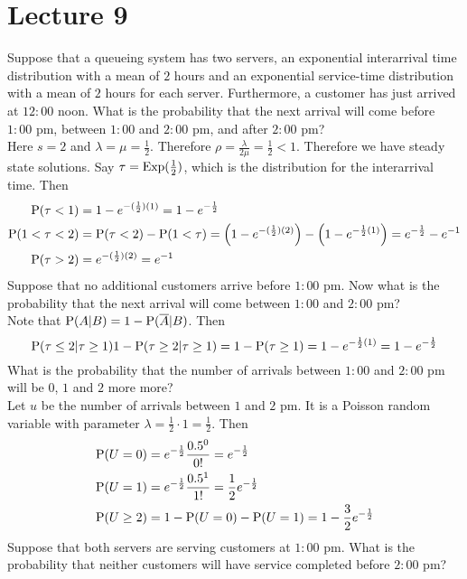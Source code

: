 \documentclass[12pt]{article}
\begin{document}
 \section{Lecture 9} 
 Suppose that a queueing system has two servers, an exponential interarrival time distribution with a mean of $2$ hours and an exponential service-time distribution with a mean of $2$ hours for each server. Furthermore, a customer has just arrived at $12:00$ noon. What is the probability that the next arrival will come before $1:00$ pm, between $1:00$ and $2:00$ pm, and after $2:00$ pm? \\
 Here $s=2$ and $\lambda = \mu = \frac{1}{2}$. Therefore $\rho = \frac{\lambda}{2\mu} = \frac{1}{2} < 1$. Therefore we have steady state solutions. Say $\tau = \text{Exp}( \frac{1}{2} )$, which is the distribution for the interarrival time. Then $$ \begin{aligned} 
 \mathrm{P}( \tau < 1 ) &= 1 - e^{-(\frac{1}{2})(1)} = 1 - e^{-\frac{1}{2}} \\ \mathrm{P}( 1 < \tau < 2 ) &= \mathrm{P}( \tau < 2 ) - \mathrm{P}( 1 < \tau ) = \Big( 1 - e^{-(\frac{1}{2})(2)} \Big) - \Big(1 - e^{-\frac{1}{2}(1)}\Big) = e^{-\frac{1}{2}} - e^{-1} \\ \mathrm{P}( \tau > 2 ) &= e^{-(\frac{1}{2})(2)} = e^{-1} \end{aligned} $$ 
 Suppose that no additional customers arrive before $1:00$ pm. Now what is the probability that the next arrival will come between $1:00$ and $2:00$ pm? \\ 
 Note that $\mathrm{P}( A|B ) = 1 - \mathrm{P}( \overline{A}|B )$. Then
 $$ \mathrm{P}( \tau \leq 2 | \tau \geq 1 ) 1 - \mathrm{P}( \tau \geq 2| \tau \geq 1 ) = 1 - \mathrm{P}( \tau \geq 1 ) = 1 - e^{-\frac{1}{2}(1)} = 1 - e^{-\frac{1}{2}} $$ 
 What is the probability that the number of arrivals between $1:00$ and $2:00$ pm will be $0$, $1$ and $2$ more more? \\
 Let $u$ be the number of arrivals between $1$ and $2$ pm. It is a Poisson random variable with parameter $\lambda = \frac{1}{2} \cdot 1 = \frac{1}{2}$. Then 
 $$ \begin{aligned} \mathrm{P}( U = 0 ) &= e^{-\frac{1}{2}}\frac{0.5^0}{0!} = e^{-\frac{1}{2}} \\ 
 \mathrm{P}( U = 1 ) &= e^{-\frac{1}{2}}\frac{0.5^1}{1!} = \frac{1}{2}e^{-\frac{1}{2}} \\ \mathrm{P}( U \geq 2 ) &= 1 - \mathrm{P}( U=0 ) - \mathrm{P}( U=1 ) = 1 - \frac{3}{2}e^{-\frac{1}{2}} \end{aligned} $$ 
 Suppose that both servers are serving customers at $1:00$ pm. What is the probability that neither customers will have service completed before $2:00$ pm? \\
\end{document}

